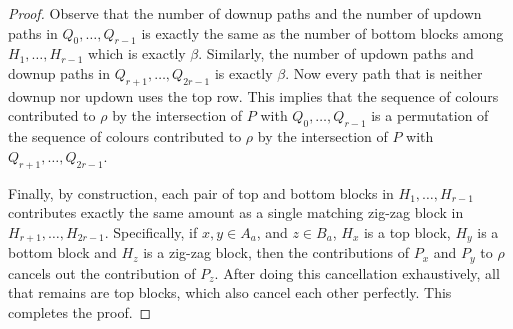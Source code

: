 \documentclass{patmorin}
\begin{document}
\begin{proof}
    Observe that the number of downup paths and the number of updown paths in $Q_0,\ldots,Q_{r-1}$ is exactly the same as the number of bottom blocks among $H_1,\ldots,H_{r-1}$ which is exactly $\beta$.  Similarly, the number of updown paths and downup paths in $Q_{r+1},\ldots,Q_{2r-1}$ is exactly $\beta$.  Now every path that is neither downup nor updown uses the top row.  This implies that the sequence of colours contributed to $\rho$ by  the intersection of $P$ with $Q_0,\ldots,Q_{r-1}$ is a permutation of the sequence of colours contributed to $\rho$ by the intersection of $P$ with $Q_{r+1},\ldots,Q_{2r-1}$.

    Finally, by construction, each pair of top and bottom blocks in $H_1,\ldots,H_{r-1}$ contributes exactly the same amount as a single matching zig-zag block in $H_{r+1},\ldots,H_{2r-1}$.  Specifically, if $x,y\in A_a$, and $z\in B_a$, $H_x$ is a top block, $H_y$ is a bottom block and $H_z$ is a zig-zag block, then the contributions of $P_x$ and $P_y$ to $\rho$ cancels out the contribution of $P_z$. After doing this cancellation exhaustively, all that remains are top blocks, which also cancel each other perfectly.  This completes the proof.
\end{proof}
\end{document}
